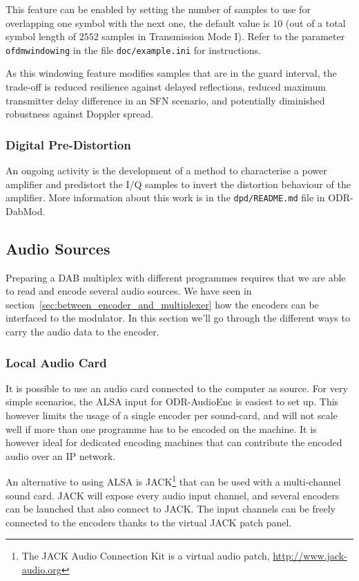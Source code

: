 This feature can be enabled by setting the number of samples to use for
overlapping one symbol with the next one, the default value is $10$ (out of a
total symbol length of $2552$ samples in Transmission Mode I). Refer to the
parameter \verb+ofdmwindowing+ in the file \verb+doc/example.ini+ for
instructions.

As this windowing feature modifies samples that are in the guard interval, the
trade-off is reduced resilience against delayed reflections, reduced maximum
transmitter delay difference in an SFN scenario, and potentially diminished
robustness against Doppler spread.

\subsubsection{Digital Pre-Distortion}
An ongoing activity is the development of a method to characterise a power
amplifier and predistort the I/Q samples to invert the distortion behaviour of
the amplifier. More information about this work is in the \verb+dpd/README.md+
file in ODR-DabMod.


\subsection{Audio Sources}
Preparing a DAB multiplex with different programmes requires that we are able to
read and encode several audio sources. We have seen in
section~\ref{sec:between_encoder_and_multiplexer} how the encoders can be
interfaced to the modulator. In this section we'll go through the different ways
to carry the audio data to the encoder.

\subsubsection{Local Audio Card}
It is possible to use an audio card connected to the computer as source. For
very simple scenarios, the ALSA input for ODR-AudioEnc is easiest to set up.
This however limits the usage of a single encoder per sound-card, and will not
scale well if more than one programme has to be encoded on the machine. It is
however ideal for dedicated encoding machines that can contribute the encoded
audio over an IP network.

An alternative to using ALSA is JACK\footnote{The JACK Audio Connection Kit is a
    virtual audio patch, \url{http://www.jack-audio.org}}
that can be used with a multi-channel sound card. JACK will expose every audio
input channel, and several encoders can be launched that also connect to JACK.
The input channels can be freely connected to the encoders thanks to the virtual
JACK patch panel.

